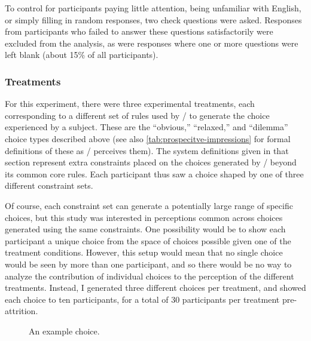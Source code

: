 To control for participants paying little attention, being unfamiliar with English, or simply filling in random responses, two check questions were asked.
%
Responses from participants who failed to answer these questions satisfactorily were excluded from the analysis, as were responses where one or more questions were left blank (about 15\% of all participants).

\subsubsection{Treatments}

For this experiment, there were three experimental treatments, each corresponding to a different set of rules used by \dunyazad/ to generate the choice experienced by a subject.
%
These are the ``obvious,'' ``relaxed,'' and ``dilemma'' choice types described above (see also \cref{tab:prospecitve-impressions} for formal definitions of these as \dunyazad/ perceives them).
%
The system definitions given in that section represent extra constraints placed on the choices generated by \dunyazad/ beyond its common core rules.
%
Each participant thus saw a choice shaped by one of three different constraint sets.


Of course, each constraint set can generate a potentially large range of specific choices, but this study was interested in perceptions common across choices generated using the same constraints.
%
One possibility would be to show each participant a unique choice from the space of choices possible given one of the treatment conditions.
%
However, this setup would mean that no single choice would be seen by more than one participant, and so there would be no way to analyze the contribution of individual choices to the perception of the different treatments.
%
Instead, I generated three different choices per treatment, and showed each choice to ten participants, for a total of 30 participants per treatment pre-attrition.

\begin{figure}[!h]
  \caption{An example choice.}
  \label{fig:results-exchoice}
\end{figure}

